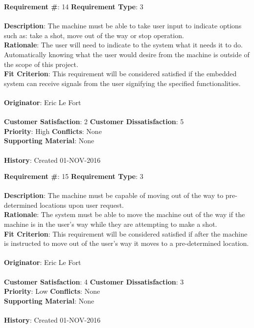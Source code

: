 \documentclass[titlepage]{article}
\begin{document}
\begin{framed}
	\noindent\textbf{Requirement \#}: 14 \hfill \textbf{Requirement Type}: 3 \hfill\\\\
	\noindent\textbf{Description}: The machine must be able to take user input to indicate options such as: take a shot, move out of the way or stop operation.\\
	\textbf{Rationale}: The user will need to indicate to the system what it needs it to do. Automatically knowing what the user would desire from the machine is outside of the scope of this project.\\
	\textbf{Fit Criterion}: This requirement will be considered satisfied if the embedded system can receive signals from the user signifying the specified functionalities.\\\\
	\textbf{Originator}: Eric Le Fort\\\\
	\noindent\textbf{Customer Satisfaction}: 2 \hfill 	\textbf{Customer Dissatisfaction}: 5 \hfill\\
	\textbf{Priority}: High \hfill \textbf{Conflicts}: None \hfill\\
	\textbf{Supporting Material}: None\\\\
	\noindent\textbf{History}: Created 01-NOV-2016
\end{framed}

\begin{framed}
	\noindent\textbf{Requirement \#}: 15 \hfill \textbf{Requirement Type}: 3 \hfill\\\\
	\noindent\textbf{Description}: The machine must be capable of moving out of the way to pre-determined locations upon user request.\\
	\textbf{Rationale}: The system must be able to move the machine out of the way if the machine is in the user's way while they are attempting to make a shot.\\
	\textbf{Fit Criterion}: This requirement will be considered satisfied if after the machine is instructed to move out of the user's way it moves to a pre-determined location.\\\\
	\textbf{Originator}: Eric Le Fort\\\\
	\noindent\textbf{Customer Satisfaction}: 4 \hfill 	\textbf{Customer Dissatisfaction}: 3 \hfill\\
	\textbf{Priority}: Low \hfill \textbf{Conflicts}: None \hfill\\
	\textbf{Supporting Material}: None\\\\
	\noindent\textbf{History}: Created 01-NOV-2016
\end{framed}
\end{document}
